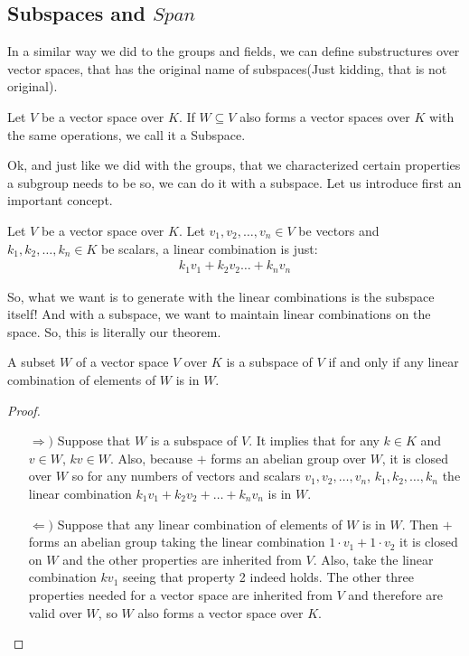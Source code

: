 \documentclass{tufte-handout}
\begin{document}
\subsection{Subspaces and $Span$}

In a similar way we did to the groups and fields, we can define substructures over vector spaces, that has the original name of subspaces(Just kidding, that is not original).
\begin{definition}[Subspace]
	Let $V$ be a vector space over $K$. If $W\subseteq V$ also forms a vector spaces over $K$ with the same operations, we call it a Subspace.
\end{definition}

Ok, and just like we did with the groups, that we characterized certain properties a subgroup needs to be so, we can do it with a subspace. Let us introduce first an important concept.

\begin{definition}
	Let $V$ be a vector space over $K$. Let $v_1, v_2, \dots, v_n \in V$ be vectors and $k_1, k_2, \dots, k_n \in K$ be scalars, a linear combination is just:
	\begin{align*}
		k_1v_1 +k_2v_2 \dots + k_nv_n
	\end{align*}
\end{definition}

So, what we want is to generate with the linear combinations is the subspace itself! And with a subspace, we want to maintain linear combinations on the space. So, this is literally our theorem.

\begin{theorem}
	A subset $W$ of a vector space $V$ over $K$ is a subspace of $V$ if and only if any linear combination of elements of $W$ is in $W$.
\end{theorem}
\begin{proof}
	\begin{itemize}
		\item[$\Rightarrow)$] Suppose that $W$ is a subspace of $V$. It implies that for any $k \in K$ and $v \in W$, $kv \in W$. Also, because $+$ forms an abelian group over $W$, it is closed over $W$ so for any numbers of vectors and scalars $v_1, v_2, \dots, v_n$, $k_1, k_2, \dots, k_n$ the linear combination $k_1v_1 + k_2v_2 + \dots + k_nv_n$ is in $W$.
		\item[$\Leftarrow)$] Suppose that any linear combination of elements of $W$ is in $W$. Then $+$ forms an abelian group taking the linear combination $1 \cdot v_1 + 1 \cdot v_2$ it is closed on $W$ and the other properties are inherited from $V$. Also, take the linear combination $kv_1$ seeing that property 2 indeed holds. The other three properties needed for a vector space are inherited from $V$ and therefore are valid over $W$, so $W$ also forms a vector space over $K$.   
	\end{itemize}
\end{proof}
\end{document}
